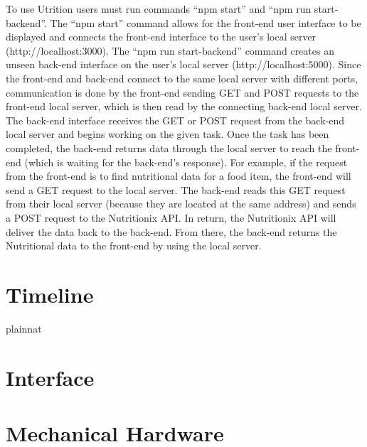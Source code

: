\documentclass[12pt, titlepage]{article}
\begin{document}

To use Utrition users must run commands “npm start” and “npm run start-backend”. The “npm start” command allows for the front-end user interface to be displayed and connects the front-end interface to the user’s local server (http://localhost:3000). The “npm run start-backend” command creates an unseen back-end interface on the user’s local server (http://localhost:5000). Since the front-end and back-end connect to the same local server with different ports, communication is done by the front-end sending GET and POST requests to the front-end local server, which is then read by the connecting back-end local server. The back-end interface receives the GET or POST request from the back-end local server and begins working on the given task. Once the task has been completed, the back-end returns data through the local server to reach the front-end (which is waiting for the back-end’s response). For example, if the request from the front-end is to find nutritional data for a food item, the front-end will send a GET request to the local server. The back-end reads this GET request from their local server (because they are located at the same address) and sends a POST request to the Nutritionix API. In return, the Nutritionix API will deliver the data back to the back-end. From there, the back-end returns the Nutritional data to the front-end by using the local server. 


\section{Timeline}


 {plainnat}


\newpage{}

\appendix

\section{Interface}


\section{Mechanical Hardware}
\end{document}
